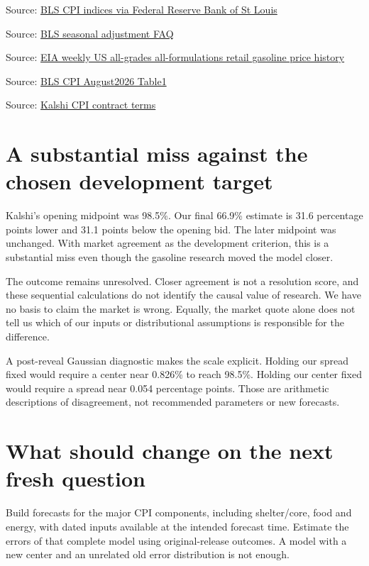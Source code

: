 \documentclass[11pt]{article}
\begin{document}
\par{\small Source: \href{https://fred.stlouisfed.org/graph/fredgraph.csv?id=CPIAUCSL,CUSR0000SETB01,CUUR0000SETB01\&cosd=2021-08-01\&coed=2026-08-01}{BLS CPI indices via Federal Reserve Bank of St Louis}}
\par{\small Source: \href{https://www.bls.gov/cpi/seasonal-adjustment/questions-and-answers.htm}{BLS seasonal adjustment FAQ}}
\par{\small Source: \href{https://www.eia.gov/dnav/pet/hist\_xls/EMM\_EPM0\_PTE\_NUS\_DPGw.xls}{EIA weekly US all-grades all-formulations retail gasoline price history}}
\par{\small Source: \href{https://www.bls.gov/news.release/cpi.t01.htm}{BLS CPI August2026 Table1}}
\par{\small Source: \href{https://assets.kalshi.com/contract\_terms/CPI.pdf}{Kalshi CPI contract terms}}
\section*{\textcolor{epdarkgreen}{A substantial miss against the chosen development target}}
Kalshi’s opening midpoint was 98.5\%. Our final 66.9\% estimate is 31.6 percentage points lower and 31.1 points below the opening bid. The later midpoint was unchanged. With market agreement as the development criterion, this is a substantial miss even though the gasoline research moved the model closer.


The outcome remains unresolved. Closer agreement is not a resolution score, and these sequential calculations do not identify the causal value of research. We have no basis to claim the market is wrong. Equally, the market quote alone does not tell us which of our inputs or distributional assumptions is responsible for the difference.


A post-reveal Gaussian diagnostic makes the scale explicit. Holding our spread fixed would require a center near 0.826\% to reach 98.5\%. Holding our center fixed would require a spread near 0.054 percentage points. Those are arithmetic descriptions of disagreement, not recommended parameters or new forecasts.


\section*{\textcolor{epdarkgreen}{What should change on the next fresh question}}
Build forecasts for the major CPI components, including shelter/core, food and energy, with dated inputs available at the intended forecast time. Estimate the errors of that complete model using original-release outcomes. A model with a new center and an unrelated old error distribution is not enough.
\end{document}
